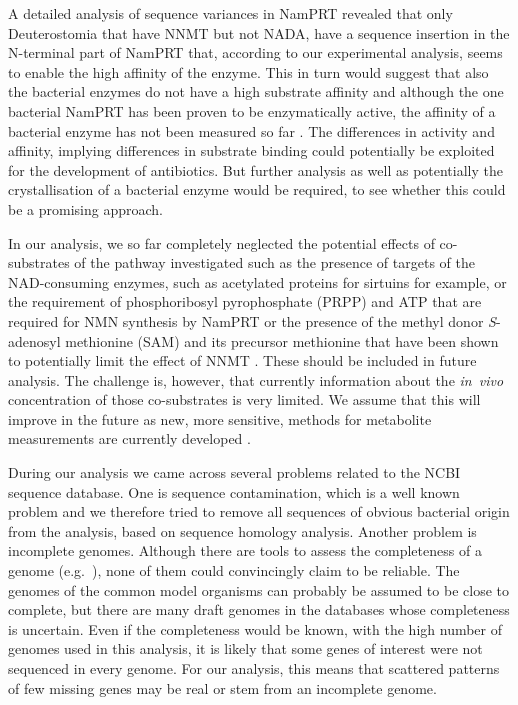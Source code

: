 A detailed analysis of sequence variances in NamPRT revealed that only Deuterostomia that have NNMT but not NADA, have a sequence insertion in the N-terminal part of NamPRT that, according to our experimental analysis, seems to enable the high affinity of the enzyme. This in turn would suggest that also the bacterial enzymes do not have a high substrate affinity and although the one bacterial NamPRT has been proven to be enzymatically active, the affinity of a bacterial enzyme has not been measured so far . The differences in activity and affinity, implying differences in substrate binding could potentially be exploited for the development of antibiotics. But further analysis as well as potentially the crystallisation of a bacterial enzyme would be required, to see whether this could be a promising approach.

In our analysis, we so far completely neglected the potential effects of co-substrates of the pathway investigated such as the presence of targets of the NAD-consuming enzymes, such as acetylated proteins for sirtuins for example, or the requirement of phosphoribosyl pyrophosphate (PRPP) and ATP that are required for NMN synthesis by NamPRT or the presence of the methyl donor \textit{S}-adenosyl methionine (SAM) and its precursor methionine that have been shown to potentially limit the effect of NNMT \cite{Ulanovskaya2013}. These should be included in future analysis. The challenge is, however, that currently information about the \textit{in~vivo} concentration of those co-substrates is very limited. We assume that this will improve in the future as new, more sensitive, methods for metabolite measurements are currently developed .

During our analysis we came across several problems related to the NCBI sequence database. One is sequence contamination, which is a well known problem  and we therefore tried to remove all sequences of obvious bacterial origin from the analysis, based on sequence homology analysis. Another problem is incomplete genomes. Although there are tools to assess the completeness of a genome (e.g.~\cite{Simao2015}), none of them could convincingly claim to be reliable. The genomes of the common model organisms can probably be assumed to be close to complete, but there are many draft genomes in the databases whose completeness is uncertain. Even if the completeness would be known, with the high number of genomes used in this analysis, it is likely that some genes of interest were not sequenced in every genome. For our analysis, this means that scattered patterns of few missing genes may be real or stem from an incomplete genome.

